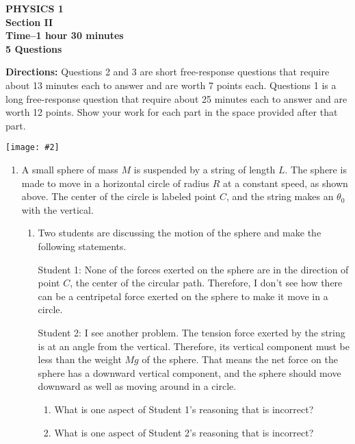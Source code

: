 \documentclass[11pt]{article}
\newcommand{\pic}[2]{
  \begin{center}\texttt{[image: \#2]}\end{center}
}
\begin{document}
\begin{center}
  \textbf{PHYSICS 1\\
    Section II\\
    Time--1 hour 30 minutes\\
    5 Questions
  }
\end{center}

\textbf{Directions:} Questions 2 and 3 are short free-response questions
that require about 13 minutes each to answer and are worth 7 points each.
Questions 1 is a long free-response question that require about 25
minutes each to answer and are worth 12 points. Show your work for each
part in the space provided after that part.

\pic{.4}{swing-around}
\begin{enumerate}
\item A small sphere of mass $M$ is suspended by a string of length $L$. The
  sphere is made to move in a horizontal circle of radius $R$ at a constant
  speed, as shown above. The center of the circle is labeled point $C$, and the
  string makes an $\theta_0$ with the vertical.
  \begin{enumerate}
  \item Two students are discussing the motion of the sphere and make the
    following statements.
    
    \vspace{.1in}Student 1: None of the forces exerted on the sphere are in the
    direction of point $C$, the center of the circular path. Therefore, I don't
    see how there can be a centripetal force exerted on the sphere to make it
    move in a circle.

    \vspace{.1in}Student 2: I see another problem. The tension force exerted by
    the string is at an angle from the vertical. Therefore, its vertical
    component must be less than the weight $Mg$ of the sphere. That means the
    net force on the sphere has a downward vertical component, and the sphere
    should move downward as well as moving around in a circle.

    \vspace{.1in}\begin{enumerate}
    \item What is one aspect of Student 1's reasoning that is incorrect?
    \item What is one aspect of Student 2's reasoning that is incorrect?
    \end{enumerate}
    

\end{enumerate}
\end{enumerate}
\end{document}
